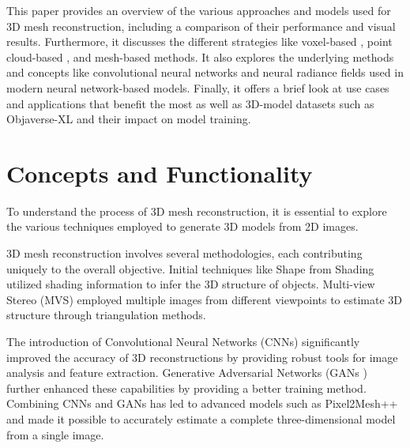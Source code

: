 This paper provides an overview of the various approaches and models used for 3D mesh reconstruction, including a comparison of their performance and visual results.
Furthermore, it discusses the different strategies like voxel-based \autocite{zhirong_wu_3d_2015}, point cloud-based \autocite{charles_pointnet_2017}, and mesh-based \autocite{wang_pixel2mesh_2018} methods.
It also explores the underlying methods and concepts like convolutional neural networks and neural radiance fields \autocite{mildenhall_nerf_2021} used in modern neural network-based models.
Finally, it offers a brief look at use cases and applications that benefit the most as well as 3D-model datasets such as Objaverse-XL \autocite{deitke_objaverse-xl_2023} and their impact on model training.



\section{Concepts and Functionality}
To understand the process of 3D mesh reconstruction, it is essential to explore the various techniques employed to generate 3D models from 2D images.

3D mesh reconstruction involves several methodologies, each contributing uniquely to the overall objective. Initial techniques like Shape from Shading \autocite{horn_shape_1989} utilized shading information to infer the 3D structure of objects. Multi-view Stereo (MVS) employed multiple images from different viewpoints to estimate 3D structure through triangulation methods.

The introduction of Convolutional Neural Networks (CNNs) significantly improved the accuracy of 3D reconstructions by providing robust tools for image analysis and feature extraction. Generative Adversarial Networks (GANs \autocite{goodfellow_generative_2014}) further enhanced these capabilities by providing a better training method.
Combining CNNs and GANs has led to advanced models such as Pixel2Mesh++ \autocite{wen_pixel2mesh_2019} and made it possible to accurately estimate a complete three-dimensional model from a single image.

